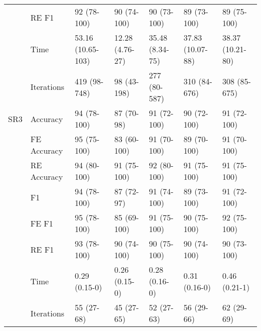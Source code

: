 \begin{tabular}{lllllll}
    & RE F1 &          92 (78-100) &          90 (74-100) &          90 (73-100) &          89 (73-100) &          89 (75-100) \\
    & Time &    53.16 (10.65-103) &      12.28 (4.76-27) &      35.48 (8.34-75) &     37.83 (10.07-88) &     38.37 (10.21-80) \\
    & Iterations &         419 (98-748) &          98 (43-198) &         277 (80-587) &         310 (84-676) &         308 (85-675) \\
SR3 & Accuracy &          94 (78-100) &           87 (70-98) &          91 (72-100) &          90 (72-100) &          91 (72-100) \\
    & FE Accuracy &          95 (75-100) &          83 (60-100) &          91 (70-100) &          89 (70-100) &          91 (70-100) \\
    & RE Accuracy &          94 (80-100) &          91 (75-100) &          92 (80-100) &          91 (75-100) &          91 (75-100) \\
    & F1 &          94 (78-100) &           87 (72-97) &          91 (74-100) &          89 (73-100) &          91 (72-100) \\
    & FE F1 &          95 (78-100) &          85 (69-100) &          91 (75-100) &          90 (75-100) &          92 (75-100) \\
    & RE F1 &          93 (78-100) &          90 (74-100) &          90 (75-100) &          90 (74-100) &          90 (73-100) \\
    & Time &        0.29 (0.15-0) &        0.26 (0.15-0) &        0.28 (0.16-0) &        0.31 (0.16-0) &        0.46 (0.21-1) \\
    & Iterations &           55 (27-68) &           45 (27-65) &           52 (27-63) &           56 (29-66) &           62 (29-69) \\
\bottomrule
\end{tabular}
